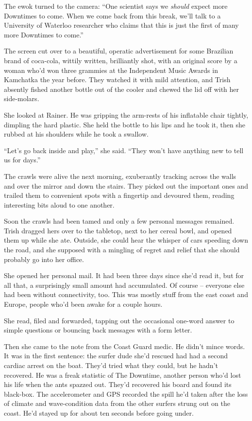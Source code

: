 The ewok turned to the camera: “One scientist says we \emph{should} 
expect more Downtimes to come. When we come back from this break, we'll 
talk to a University of Waterloo researcher who claims that this is 
just the first of many more Downtimes to come.”

The screen cut over to a beautiful, operatic advertisement for some 
Brazilian brand of coca-cola, wittily written, brilliantly shot, with 
an original score by a woman who'd won three grammies at the 
Independent Music Awards in Kamchatka the year before. They watched it 
with mild attention, and Trish absently fished another bottle out of 
the cooler and chewed the lid off with her side-molars.

She looked at Rainer. He was gripping the arm-rests of his inflatable 
chair tightly, dimpling the hard plastic. She held the bottle to his 
lips and he took it, then she rubbed at his shoulders while he took a 
swallow.

“Let's go back inside and play,” she said. “They won't have 
anything new to tell us for days.”

\tb

The crawls were alive the next morning, exuberantly tracking across the 
walls and over the mirror and down the stairs. They picked out the 
important ones and trailed them to convenient spots with a fingertip 
and devoured them, reading interesting bits aloud to one another.

Soon the crawls had been tamed and only a few personal messages 
remained. Trish dragged hers over to the tabletop, next to her cereal 
bowl, and opened them up while she ate. Outside, she could hear the 
whisper of cars speeding down the road, and she supposed with a 
mingling of regret and relief that she should probably go into her 
office.

She opened her personal mail. It had been three days since she'd read 
it, but for all that, a surprisingly small amount had accumulated. Of 
course -- everyone else had been without connectivity, too. This was 
mostly stuff from the east coast and Europe, people who'd been awake 
for a couple hours.

She read, filed and forwarded, tapping out the occasional one-word 
answer to simple questions or bouncing back messages with a form letter.

Then she came to the note from the Coast Guard medic. He didn't mince 
words. It was in the first sentence: the surfer dude she'd rescued had 
had a second cardiac arrest on the boat. They'd tried what they could, 
but he hadn't recovered. He was a freak statistic of The Downtime, 
another person who'd lost his life when the ants spazzed out. They'd 
recovered his board and found its black-box. The accelerometer and GPS 
recorded the spill he'd taken after the loss of climate and 
wave-condition data from the other surfers strung out on the coast. 
He'd stayed up for about ten seconds before going under.

